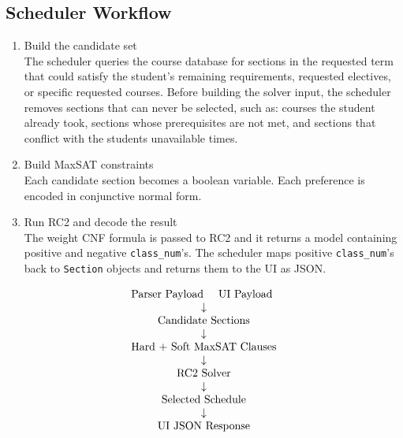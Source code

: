 \documentclass[11pt, a4paper]{article} %
\newcommand{\<}{\langle}
\renewcommand{\>}{\rangle}
\begin{document}
\subsection*{Scheduler Workflow}
\begin{enumerate}
    \vspace{-2mm}
    \setlength{\itemsep}{-.2em}
    \item Build the candidate set\\
    The scheduler queries the course database for sections in the requested term that could satisfy the student's remaining requirements, requested electives, or specific requested courses. Before building the solver input, the scheduler removes sections that can never be selected, such as: courses the student already took, sections whose prerequisites are not met, and sections that conflict with the students unavailable times.
    \item Build MaxSAT constraints\\
    Each candidate section becomes a boolean variable. Each preference is encoded in conjunctive normal form.
    \item Run RC2 and decode the result\\
    The weight CNF formula is passed to RC2 and it returns a model containing positive and negative \texttt{class\_num}'s. The scheduler maps positive \texttt{class\_num}'s back to \texttt{Section} objects and returns them to the UI as JSON.
\end{enumerate}
\[
  \begin{array}{cc}
  \text{Parser Payload} & \text{UI Payload} \\
  \multicolumn{2}{c}{\downarrow} \\
  \multicolumn{2}{c}{\text{Candidate Sections}} \\
  \multicolumn{2}{c}{\downarrow} \\
  \multicolumn{2}{c}{\text{Hard + Soft MaxSAT Clauses}} \\
  \multicolumn{2}{c}{\downarrow} \\
  \multicolumn{2}{c}{\text{RC2 Solver}} \\
  \multicolumn{2}{c}{\downarrow} \\
  \multicolumn{2}{c}{\text{Selected Schedule}} \\
  \multicolumn{2}{c}{\downarrow} \\
  \multicolumn{2}{c}{\text{UI JSON Response}}
  \end{array}
  \]
\end{document}
